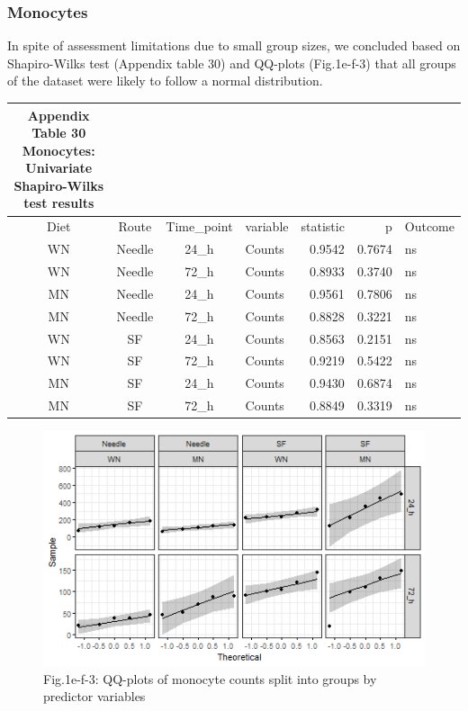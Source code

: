 \documentclass[
  12pt,
  letterpaper,
]{article}
\begin{document}
\subsubsection{Monocytes}\label{monocytes-2}

In spite of assessment limitations due to small group sizes, we concluded based on Shapiro-Wilks test (Appendix table 30) and QQ-plots (Fig.1e-f-3) that all groups of the dataset were likely to follow a normal distribution.

\begingroup
\fontsize{12.0pt}{14.4pt}\selectfont
\begin{longtable}{ccclrrl}
\caption*{
{\large \textbf{Appendix Table 30}} \\ 
{\small \textbf{Monocytes: Univariate Shapiro-Wilks test results}}
} \\ 
\toprule
{Diet} & {Route} & Time\_point & {variable} & {statistic} & {p} & {Outcome} \\ 
\midrule\addlinespace[2.5pt]
WN & Needle & 24\_h & Counts & 0.9542 & 0.7674 & ns \\ 
WN & Needle & 72\_h & Counts & 0.8933 & 0.3740 & ns \\ 
MN & Needle & 24\_h & Counts & 0.9561 & 0.7806 & ns \\ 
MN & Needle & 72\_h & Counts & 0.8828 & 0.3221 & ns \\ 
WN & SF & 24\_h & Counts & 0.8563 & 0.2151 & ns \\ 
WN & SF & 72\_h & Counts & 0.9219 & 0.5422 & ns \\ 
MN & SF & 24\_h & Counts & 0.9430 & 0.6874 & ns \\ 
MN & SF & 72\_h & Counts & 0.8849 & 0.3319 & ns \\ 
\bottomrule
\end{longtable}
\endgroup

\begin{figure}[H]

{\centering \includegraphics[width=0.95\linewidth,]{Statistics_Report_files/figure-latex/qq-plot-figure-1e-f-monocytes-1} 

}

\caption{Fig.1e-f-3: QQ-plots of monocyte counts split into groups by predictor variables}\label{fig:qq-plot-figure-1e-f-monocytes}
\end{figure}
\end{document}
